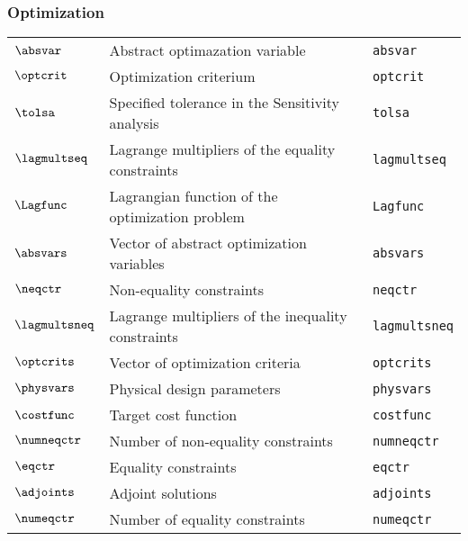 \subsubsection*{Optimization}
\begin{tabular}{l l l}
$\absvar$ & Abstract optimazation variable& \texttt{absvar}\\
$\optcrit$ & Optimization criterium& \texttt{optcrit}\\
$\tolsa$ & Specified tolerance in the Sensitivity analysis& \texttt{tolsa}\\
$\lagmultseq$ & Lagrange multipliers of the equality constraints& \texttt{lagmultseq}\\
$\Lagfunc$ & Lagrangian function of the optimization problem& \texttt{Lagfunc}\\
$\absvars$ & Vector of abstract optimization variables& \texttt{absvars}\\
$\neqctr$ & Non-equality constraints& \texttt{neqctr}\\
$\lagmultsneq$ & Lagrange multipliers of the inequality constraints& \texttt{lagmultsneq}\\
$\optcrits$ & Vector of optimization criteria& \texttt{optcrits}\\
$\physvars$ & Physical design parameters& \texttt{physvars}\\
$\costfunc$ & Target cost function& \texttt{costfunc}\\
$\numneqctr$ & Number of non-equality constraints& \texttt{numneqctr}\\
$\eqctr$ & Equality constraints& \texttt{eqctr}\\
$\adjoints$ & Adjoint solutions& \texttt{adjoints}\\
$\numeqctr$ & Number of equality constraints& \texttt{numeqctr}\\
\end{tabular}

